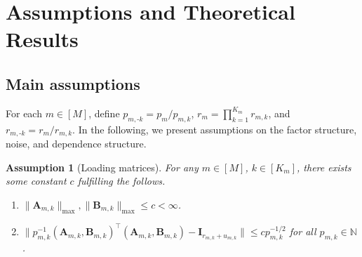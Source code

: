\documentclass[aos]{imsart}
\theoremstyle{plain}
\newtheorem{assumption}{Assumption}
\theoremstyle{definition}
\def\N{\mathbb{N}}
\def\bI{\mathbf{I}}
\def\bA{\mathbf{A}}
\def\bB{\mathbf{B}}
\def\trans{\intercal}
\begin{document}
\section{Assumptions and Theoretical Results}\label{sec: theorem}

\subsection{Main assumptions}\label{subsec: assumption}

For each $m\in[M]$, define $p_{m,\text{-}k} =p_m/p_{m,k}$, $r_m= \prod_{k=1}^{K_m} r_{m,k}$, and $r_{m,\text{-}k} =r_m/r_{m,k}$. In the following, we present assumptions on the factor structure, noise, and dependence structure.


\begin{assumption}[Loading matrices]\label{ass: loadings}
For any $m\in[M]$, $k\in[K_m]$, there exists some constant $c$ fulfilling the follows.
\begin{enumerate}[itemsep=0pt, label = (\alph*), left = 0pt]
    \item $\|\bA_{m,k}\|_{\max}, \|\bB_{m,k}\|_{\max} \leq c <\infty$.
    \item $\big\| p_{m,k}^{-1} (\bA_{m,k}, \bB_{m,k})^\trans (\bA_{m,k}, \bB_{m,k}) -\bI_{r_{m,k}+u_{m,k}} \big\| \leq c p_{m,k}^{-1/2}$ for all $p_{m,k}\in \N$.
\end{enumerate}
\end{assumption}
\end{document}
